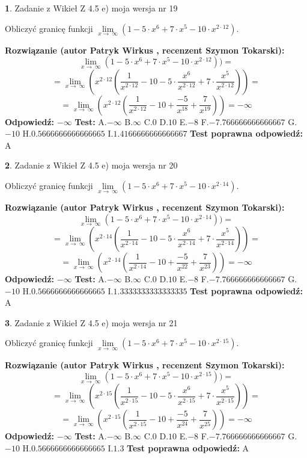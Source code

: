 \documentclass[12pt, a4paper]{article}
\theoremstyle{definition} %
\newtheorem{zad}{}
\newcommand{\zadStart}[1]{\begin{zad}#1\newline}
\newcommand{\zadStop}{\end{zad}}
\newcommand{\rozwStart}[2]{\noindent \textbf{Rozwiązanie (autor #1 , recenzent #2): }\newline}
\newcommand{\rozwStop}{\newline}
\newcommand{\odpStart}{\noindent \textbf{Odpowiedź:}\newline}
\newcommand{\odpStop}{\newline}
\newcommand{\testStart}{\noindent \textbf{Test:}\newline}
\newcommand{\testStop}{\newline}
\newcommand{\kluczStart}{\noindent \textbf{Test poprawna odpowiedź:}\newline}
\newcommand{\kluczStop}{\newline}
\begin{document}
\zadStart{Zadanie z Wikieł Z 4.5 e) moja wersja nr 19}


Obliczyć granicę funkcji  $\lim\limits_{x\to\ \infty}(1 - 5 \cdot x^{6}+7 \cdot x^{5}- 10 \cdot x^{2\cdot12})$.
\zadStop
\rozwStart{Patryk Wirkus}{Szymon Tokarski}
$$\lim\limits_{x\to\ \infty}(1 - 5 \cdot x^{6}+7 \cdot x^{5}- 10 \cdot x^{2\cdot12}))=$$
$$=\lim\limits_{x\to\ \infty}(x^{2\cdot12}(\frac{1}{x^{2\cdot12}}-10 -5 \cdot \frac{x^{6}}{x^{2\cdot12}}+7 \cdot \frac{x^{5}}{x^{2\cdot12}}))=$$
$$=\lim\limits_{x\to\ \infty}(x^{2\cdot12}(\frac{1}{x^{2\cdot12}}-10 + \frac{-5}{x^{18}}+ \frac{7}{x^{19}}))=-\infty$$
\rozwStop
\odpStart
$-\infty$
\odpStop
\testStart
A.$-\infty$ B.$\infty$ C.$0$ D.$10$ E.$-8$
F.$-7.766666666666667$ G.$-10$
H.$0.5666666666666665$
I.$1.4166666666666667$
\testStop
\kluczStart
A
\kluczStop



\zadStart{Zadanie z Wikieł Z 4.5 e) moja wersja nr 20}


Obliczyć granicę funkcji  $\lim\limits_{x\to\ \infty}(1 - 5 \cdot x^{6}+7 \cdot x^{5}- 10 \cdot x^{2\cdot14})$.
\zadStop
\rozwStart{Patryk Wirkus}{Szymon Tokarski}
$$\lim\limits_{x\to\ \infty}(1 - 5 \cdot x^{6}+7 \cdot x^{5}- 10 \cdot x^{2\cdot14}))=$$
$$=\lim\limits_{x\to\ \infty}(x^{2\cdot14}(\frac{1}{x^{2\cdot14}}-10 -5 \cdot \frac{x^{6}}{x^{2\cdot14}}+7 \cdot \frac{x^{5}}{x^{2\cdot14}}))=$$
$$=\lim\limits_{x\to\ \infty}(x^{2\cdot14}(\frac{1}{x^{2\cdot14}}-10 + \frac{-5}{x^{22}}+ \frac{7}{x^{23}}))=-\infty$$
\rozwStop
\odpStart
$-\infty$
\odpStop
\testStart
A.$-\infty$ B.$\infty$ C.$0$ D.$10$ E.$-8$
F.$-7.766666666666667$ G.$-10$
H.$0.5666666666666665$
I.$1.3333333333333335$
\testStop
\kluczStart
A
\kluczStop



\zadStart{Zadanie z Wikieł Z 4.5 e) moja wersja nr 21}


Obliczyć granicę funkcji  $\lim\limits_{x\to\ \infty}(1 - 5 \cdot x^{6}+7 \cdot x^{5}- 10 \cdot x^{2\cdot15})$.
\zadStop
\rozwStart{Patryk Wirkus}{Szymon Tokarski}
$$\lim\limits_{x\to\ \infty}(1 - 5 \cdot x^{6}+7 \cdot x^{5}- 10 \cdot x^{2\cdot15}))=$$
$$=\lim\limits_{x\to\ \infty}(x^{2\cdot15}(\frac{1}{x^{2\cdot15}}-10 -5 \cdot \frac{x^{6}}{x^{2\cdot15}}+7 \cdot \frac{x^{5}}{x^{2\cdot15}}))=$$
$$=\lim\limits_{x\to\ \infty}(x^{2\cdot15}(\frac{1}{x^{2\cdot15}}-10 + \frac{-5}{x^{24}}+ \frac{7}{x^{25}}))=-\infty$$
\rozwStop
\odpStart
$-\infty$
\odpStop
\testStart
A.$-\infty$ B.$\infty$ C.$0$ D.$10$ E.$-8$
F.$-7.766666666666667$ G.$-10$
H.$0.5666666666666665$
I.$1.3$
\testStop
\kluczStart
A
\kluczStop
\end{document}
